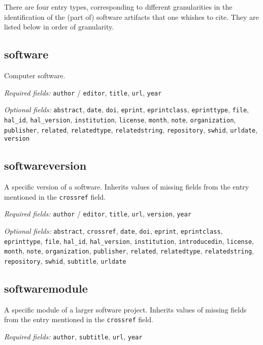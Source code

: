 
There are four entry types, corresponding to different granularities
in the identification of the (part of) software artifacts that one
whishes to cite. They are listed below in order of granularity.

\subsection{software}
Computer software. 

\emph{Required fields:} \texttt{author} / \texttt{editor}, \texttt{title}, \texttt{url}, \texttt{year}

\emph{Optional fields:} \texttt{abstract}, \texttt{date}, \texttt{doi}, \texttt{eprint}, \texttt{eprintclass}, \texttt{eprinttype}, \texttt{file}, \texttt{hal\_id}, \texttt{hal\_version},
\texttt{institution}, \texttt{license}, \texttt{month}, \texttt{note}, \texttt{organization}, \texttt{publisher},
\texttt{related}, \texttt{relatedtype}, \texttt{relatedstring}, \texttt{repository}, \texttt{swhid}, \texttt{urldate}, \texttt{version}

\subsection{softwareversion}
A specific version of a software.  Inherits values of missing
fields from the entry mentioned in the \texttt{crossref} field.

\emph{Required fields:} \texttt{author} / \texttt{editor}, \texttt{title}, \texttt{url}, \texttt{version}, \texttt{year}

\emph{Optional fields:} \texttt{abstract}, \texttt{crossref}, \texttt{date}, \texttt{doi}, \texttt{eprint}, \texttt{eprintclass}, \texttt{eprinttype}, \texttt{file}, \texttt{hal\_id}, \texttt{hal\_version},
\texttt{institution}, \texttt{introducedin}, \texttt{license}, \texttt{month}, \texttt{note}, \texttt{organization}, \texttt{publisher},
\texttt{related}, \texttt{relatedtype}, \texttt{relatedstring}, \texttt{repository}, \texttt{swhid}, \texttt{subtitle}, \texttt{urldate}

\subsection{softwaremodule}

A specific module of a larger software project. Inherits values of missing
fields from the entry mentioned in the \texttt{crossref} field.

\emph{Required fields:} \texttt{author}, \texttt{subtitle}, \texttt{url}, \texttt{year}

